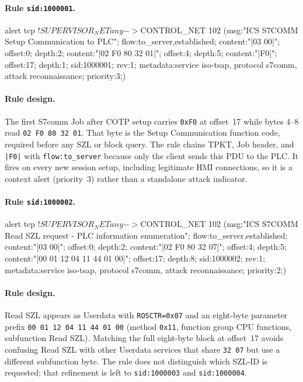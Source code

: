 \documentclass[../main.tex]{subfiles}
\begin{document}
\paragraph{Rule \texttt{sid:1000001}.}
\begin{packetdump}
alert tcp !$SUPERVISOR_NET any -> $CONTROL_NET 102 (msg:"ICS S7COMM Setup Communication to PLC";
  flow:to_server,established; content:"|03 00|"; offset:0; depth:2;
  content:"|02 F0 80 32 01|"; offset:4; depth:5; content:"|F0|";
  offset:17; depth:1; sid:1000001; rev:1;
  metadata:service iso-tsap, protocol s7comm, attack reconnaissance; priority:3;)
\end{packetdump}

\paragraph{Rule design.}
The first S7comm Job after COTP setup carries \texttt{0xF0} at offset~17 while bytes 4--8 read \texttt{02 F0 80 32 01}. That byte is the Setup Communication function code, required before any SZL or block query. The rule chains TPKT, Job header, and \texttt{|F0|} with \texttt{flow:to\_server} because only the client sends this PDU to the PLC. It fires on every new session setup, including legitimate HMI connections, so it is a context alert (priority~3) rather than a standalone attack indicator.

\paragraph{Rule \texttt{sid:1000002}.}
\begin{packetdump}
alert tcp !$SUPERVISOR_NET any -> $CONTROL_NET 102 (msg:"ICS S7COMM Read SZL request - PLC
  information enumeration"; flow:to_server,established; content:"|03 00|";
  offset:0; depth:2; content:"|02 F0 80 32 07|"; offset:4; depth:5;
  content:"|00 01 12 04 11 44 01 00|"; offset:17; depth:8; sid:1000002; rev:1;
  metadata:service iso-tsap, protocol s7comm, attack reconnaissance; priority:2;)
\end{packetdump}

\paragraph{Rule design.}
Read SZL appears as Userdata with \texttt{ROSCTR=0x07} and an eight-byte parameter prefix \texttt{00 01 12 04 11 44 01 00} (method \texttt{0x11}, function group CPU functions, subfunction Read SZL). Matching the full eight-byte block at offset~17 avoids confusing Read SZL with other Userdata services that share \texttt{32 07} but use a different subfunction byte. The rule does not distinguish which SZL-ID is requested; that refinement is left to \texttt{sid:1000003} and \texttt{sid:1000004}.
\end{document}
